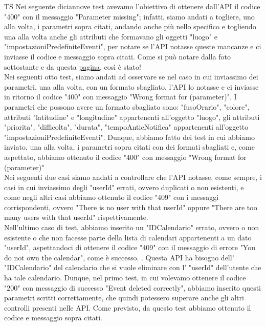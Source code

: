 \begin{listaPersonale}{TS}
                Nei seguente diciannove test avevamo l'obiettivo di ottenere dall'API il codice "400" con il messaggio "Parameter missing"; infatti, siamo andati a togliere, uno alla volta, i parametri sopra citati, andando anche più nello specifico e togliendo una alla volta anche gli attributi che formavano gli oggetti "luogo" e "impostazioniPredefiniteEventi", per notare se l'API notasse queste mancanze e ci inviasse il codice e messaggio sopra citati. Come si può notare dalla foto sottostante e da questa \href{https://plan-it.it/test-report.html} {pagina}, così è stato!  \\
                Nei seguenti otto test, siamo andati ad osservare se nel caso in cui inviassimo dei parametri, una alla volta, con un formato sbagliato, l'API lo notasse e ci inviasse in ritorno il codice "400" con messaggio  "Wrong format for (parameter)". I parametri che possono avere un formato sbagliato sono: "fusoOrario", "colore", attributi "latitudine" e "longitudine" appartenenti all'oggetto "luogo", gli attributi "priorita", "difficolta", "durata", "tempoAnticNotifica" appartenenti all'oggetto "impostazioniPredefiniteEventi". Dunque, abbiamo fatto dei test in cui abbiamo inviato, una alla volta, i parametri sopra citati con dei formati sbagliati e, come aspettato, abbiamo ottenuto il codice "400" con messaggio "Wrong format for (parameter)"  \\
                Nei seguenti due casi siamo andati a controllare che l'API notasse, come sempre, i casi in cui inviassimo degli "userId" errati, ovvero duplicati o non esistenti, e come negli altri casi abbiamo ottenuto il codice "409" con i messaggi corrispondenti, ovvero "There is no user with that userId" oppure "There are too many users with that userId" rispettivamente. \\
                Nell'ultimo caso di test, abbiamo inserito un "IDCalendario" errato, ovvero o non esistente o che non facesse parte della lista di calendari appartenenti a un dato "userId", aspettandoci di ottenere il codice "409" con il messaggio di errore "You do not own the calendar", come è successo.
                .
                Questa API ha bisogno dell' "IDCalendario" del calendario che si vuole eliminare con l' "userId" dell'utente che ha tale calendario. Dunque, nel primo test, in cui volevamo ottenere il codice "200" con messaggio di successo "Event deleted correctly", abbiamo inserito questi parametri scritti correttamente, che quindi potessero superare anche gli altri controlli presenti nelle API. Come previsto, da questo test abbiamo ottenuto il codice e messaggio sopra citati.

\end{listaPersonale}
